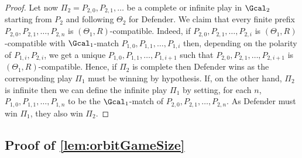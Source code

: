 \begin{proof}
Let now $\Pi_2=P_{2,0},P_{2,1},\dots$ be a complete or infinite play in $\Gcal_2$ starting from $P_2$ and following $\Theta_2$ for Defender. We claim that every finite prefix $P_{2,0},P_{2,1},\dots,P_{2,n}$ is $(\Theta_1,R)$-compatible. Indeed, if $P_{2,0},P_{2,1},\dots,P_{2,i}$ is $(\Theta_1,R)$-compatible with $\Gcal_1$-match $P_{1,0},P_{1,1},\dots,P_{1,i}$ then, depending on the polarity of $P_{1,i},P_{2,i}$, we get a unique  $P_{1,0},P_{1,1},\dots,P_{1,i+1}$ such that $P_{2,0},P_{2,1},\dots,P_{2,i+1}$ is $(\Theta_1,R)$-compatible. Hence, if $\Pi_2$ is complete then Defender wins as the corresponding play $\Pi_1$ must be winning by hypothesis. If, on the other hand, $\Pi_2$ is infinite then we can define the infinite play $\Pi_1$ by setting, for each $n$, $P_{1,0},P_{1,1},\dots,P_{1,n}$ to be the $\Gcal_1$-match of $P_{2,0},P_{2,1},\dots,P_{2,n}$. As Defender must win $\Pi_1$, they also win $\Pi_2$.
\end{proof}

\subsection{Proof of \cref{lem:orbitGameSize}}\label{app:orbitGameSize}




